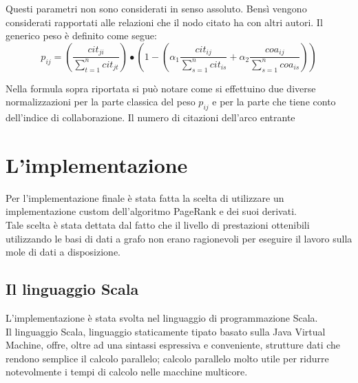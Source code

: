 \documentclass[a4paper,12pt]{article}
\let\oldsection\section
\renewcommand\section{\clearpage\oldsection}
\begin{document}
\begin{enumerate}
  Questi parametri non sono considerati in senso assoluto. Bensì vengono considerati rapportati alle relazioni che il nodo citato ha con altri autori.
  Il generico peso è definito come segue:
  \[
    p_{ij} = 
    \left( 
      \frac
      {\displaystyle cit_{ji}}
      {\displaystyle \sum_{t=1}^{n} {cit_{jt}}}
    \right)
    \bullet
    \left(
      1 - 
      \left(
      \alpha_1
      \frac
      {\displaystyle cit_{ij}}
      {\displaystyle \sum_{s=1}^{n} {cit_{is}}}
      +
      \alpha_2
      \frac
      {\displaystyle coa_{ij}}
      {\displaystyle \sum_{s=1}^{n} {coa_{is}}}
      \right)
    \right)
  \]
  
  Nella formula sopra riportata si può notare come si effettuino due diverse normalizzazioni per la parte classica del peso $p_{ij}$ e per la parte che tiene conto dell'indice di collaborazione. Il numero di citazioni dell'arco entrante
\end{enumerate}

\section{L'implementazione}
Per l'implementazione finale è stata fatta la scelta di utilizzare un implementazione custom dell'algoritmo PageRank e dei suoi derivati. \\
Tale scelta è stata dettata dal fatto che il livello di prestazioni ottenibili utilizzando le basi di dati a grafo non erano ragionevoli per eseguire il lavoro sulla mole di dati a disposizione.
\subsection{Il linguaggio Scala}
L'implementazione è stata svolta nel linguaggio di programmazione Scala. \\
Il linguaggio Scala, linguaggio staticamente tipato basato sulla Java Virtual Machine, offre, oltre ad una sintassi espressiva e conveniente, strutture dati che rendono semplice il calcolo parallelo; calcolo parallelo molto utile per ridurre notevolmente i tempi di calcolo nelle macchine multicore.
\end{document}
